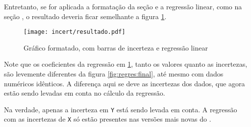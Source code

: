     Entretanto, se for aplicada a formatação da seção  e a regressão linear, como na seção , o resultado deveria ficar semelhante a figura \ref{fig:incert:resultado}.

    \begin{figure}[htbp]
        \centering
        \texttt{[image: incert/resultado.pdf]}

        \caption{Gráfico formatado, com barras de incerteza e regressão linear}
        \label{fig:incert:resultado}
    \end{figure}

    \begin{nota}
        Note que os coeficientes da regressão em \ref{fig:incert:resultado}, tanto os valores quanto as incertezas, são levemente diferentes da figura \ref{fig:regres:final}, até mesmo com dados numéricos idênticos. A diferença aqui se deve as incertezas dos dados, que agora estão sendo levadas em conta no cálculo da regressão.

        Na verdade, apenas a incerteza em \texttt{Y} está sendo levada em conta. A regressão com as incertezas de \texttt{X} só estão presentes nas versões mais novas do \software.
    \end{nota}

